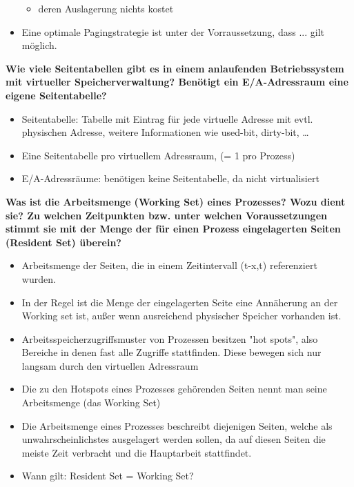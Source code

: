 \documentclass[a4paper]{article}
\begin{document}
\begin{description*}
\begin{itemize}
\begin{itemize}
                  \item deren Auslagerung nichts kostet
              \end{itemize}
        \item Eine optimale Pagingstrategie ist unter der Vorraussetzung, dass ... gilt möglich.
    \end{itemize}
    \item \textbf{Wie viele Seitentabellen gibt es in einem anlaufenden Betriebssystem mit virtueller Speicherverwaltung? Benötigt ein E/A-Adressraum eine eigene Seitentabelle?}
    \begin{itemize}
        \item Seitentabelle: Tabelle mit Eintrag für jede virtuelle Adresse mit evtl. physischen Adresse, weitere Informationen wie used-bit, dirty-bit, …
        \item Eine Seitentabelle pro virtuellem Adressraum, (= 1 pro Prozess)
        \item E/A-Adressräume: benötigen keine Seitentabelle, da nicht virtualisiert
    \end{itemize}
    \item \textbf{Was ist die Arbeitsmenge (Working Set) eines Prozesses? Wozu dient sie? Zu welchen Zeitpunkten bzw. unter welchen Voraussetzungen stimmt sie mit der Menge der für einen Prozess eingelagerten Seiten (Resident Set) überein?}
    \begin{itemize}
        \item Arbeitsmenge der Seiten, die in einem Zeitintervall (t-x,t) referenziert wurden.
        \item In der Regel ist die Menge der eingelagerten Seite eine Annäherung an der Working set ist, außer wenn ausreichend physischer Speicher vorhanden ist.
        \item Arbeitsspeicherzugriffsmuster von Prozessen besitzen "hot spots", also Bereiche in denen fast alle Zugriffe stattfinden. Diese bewegen sich nur langsam durch den virtuellen Adressraum
        \item Die zu den Hotspots eines Prozesses gehörenden Seiten nennt man seine Arbeitsmenge (das Working Set)
        \item Die Arbeitsmenge eines Prozesses beschreibt diejenigen Seiten, welche als unwahrscheinlichstes ausgelagert werden sollen, da auf diesen Seiten die meiste Zeit verbracht und die Hauptarbeit stattfindet.
        \item Wann gilt: Resident Set = Working Set?
              \begin{itemize}

\end{itemize}
\end{itemize}
\end{description*}
\end{document}
